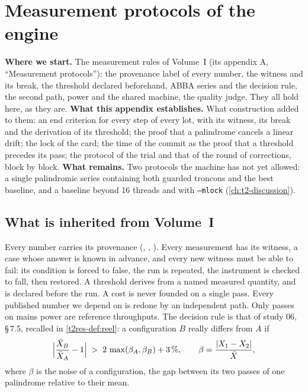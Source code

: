 \chapter{Measurement protocols of the engine}\label{t2ann:protocoles}

\begin{origine}
\textbf{Where we start.} The measurement rules of Volume~I (its appendix A, \enquote{Measurement protocols}): the provenance label of every number, the witness and its break, the threshold declared beforehand, ABBA series and the decision rule, the second path, power and the shared machine, the quality judge. They all hold here, as they are.
\textbf{What this appendix establishes.} What construction added to them: an end criterion for every step of every lot, with its witness, its break and the derivation of its threshold; the proof that a palindrome cancels a linear drift; the lock of the card; the time of the commit as the proof that a threshold precedes its pass; the protocol of the trial and that of the round of corrections, block by block.
\textbf{What remains.} Two protocols the machine has not yet allowed: a single palindromic series containing both guarded troncons and the best baseline, and a baseline beyond 16 threads and with \texttt{--mlock} (\cref{ch:t2-discussion}).
\end{origine}

\section{What is inherited from Volume~I}\label{t2ann:sec:herite}

Every number carries its provenance (\mes, \calc, \litt). Every measurement has its witness, a case whose answer is known in advance, and every new witness must be able to fail: its condition is forced to false, the run is repeated, the instrument is checked to fall, then restored. A threshold derives from a named measured quantity, and is declared before the run. A cost is never founded on a single pass. Every published number we depend on is redone by an independent path. Only passes on mains power are reference throughputs. The decision rule is that of study 06, \S\,7.5, recalled in \cref{t2res-def:reel}: a configuration $B$ really differs from $A$ if
\begin{equation}\label{t2ann:eq:regle}
\Bigl|\frac{\bar X_B}{\bar X_A} - 1\Bigr| \;>\; 2\,\max(\beta_A, \beta_B) + 3\,\%,
\qquad \beta = \frac{|X_1 - X_2|}{\bar X},
\end{equation}
where $\beta$ is the noise of a configuration, the gap between its two passes of one palindrome relative to their mean.

